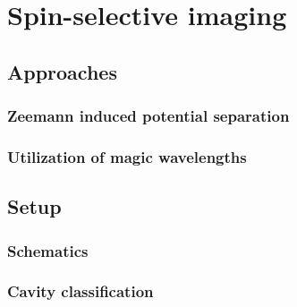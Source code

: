\chapter{Spin-selective imaging}
	\section{Approaches}
		\subsection{Zeemann induced potential separation}
		\subsection{Utilization of magic wavelengths}
	\section{Setup}
		\subsection{Schematics}
		\subsection{Cavity classification}

